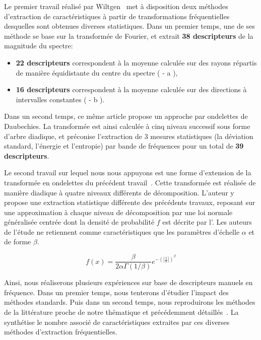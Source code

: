 Le premier travail réalisé par Wiltgen~\cite{Wiltgen2008} met à disposition deux méthodes d'extraction de caractéristiques à partir de transformations fréquentielles desquelles sont obtenues diverses statistiques. Dans un premier temps, une de ses méthode se base sur la transformée de Fourier, et extrait \textbf{38 descripteurs} de la magnitude du spectre:
\begin{itemize}
    \item \textbf{22 descripteurs} correspondent à la moyenne calculée sur des rayons répartis de manière équidistante du centre du spectre ( - a ),
    \item \textbf{16 descripteurs} correspondent à la moyenne calculée sur des directions à intervalles constantes ( - b ).
\end{itemize} Dans un second temps, ce même article propose un approche par ondelettes de Daubechies. La transformée est ainsi calculée à cinq niveau successif sous forme d'arbre diadique, et préconise l'extraction de 3 mesures statistiques (la déviation standard, l'énergie et l'entropie) par bande de fréquences pour un total de \textbf{39 descripteurs}.\par

Le second travail sur lequel nous nous appuyons est une forme d'extension de la transformée en ondelettes du précédent travail~\cite{Halimi2017a}. Cette transformée est réalisée de manière diadique à quatre niveaux différents de décomposition. L'auteur y propose une extraction statistique différente des précédents travaux, reposant sur une approximation à chaque niveau de décomposition par une loi normale généralisée centrée dont la densité de probabilité $f$ est décrite par l'. Les auteurs de l'étude ne retiennent comme caractéristiques que les paramètres d'échelle $\alpha$ et de forme $\beta$.\par
\begin{equation}
    f(x)= \frac{\beta}{2\alpha\Gamma(1/\beta)} e^{-\left(|\frac{x}{\alpha}|\right)^\beta}
    \label{eq:ggd}
\end{equation}
 
Ainsi, nous réaliserons plusieurs expériences sur base de descripteurs manuels en fréquence. Dans un premier temps, nous tenterons d'étudier l'impact des méthodes standards. Puis dans un second temps, nous reproduirons les méthodes de la littérature proche de notre thématique et précédemment détaillés~\cite{Wiltgen2008, Halimi2017a}. La  synthétise le nombre associé de caractéristiques extraites par ces diverses méthodes d'extraction fréquentielles.\par

